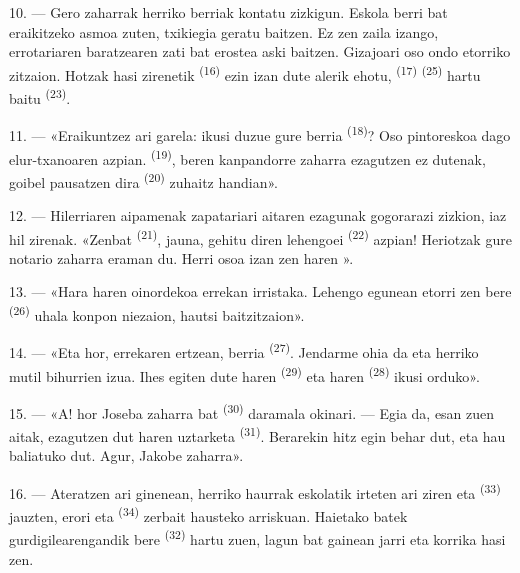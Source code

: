 \VUsaut{3.0mm}
\VUsaut{3.0mm}

10. --- Gero zaharrak herriko berriak kontatu zizkigun. Eskola berri bat eraikitzeko
asmoa zuten,  txikiegia geratu baitzen. Ez zen zaila izango,
errotariaren baratzearen zati bat erostea aski baitzen. Gizajoari oso ondo etorriko
zitzaion. Hotzak hasi zirenetik  \textsuperscript{(16)}
 ezin izan dute alerik ehotu, 
\textsuperscript{(17)}  \textsuperscript{(25)} hartu baitu
 \textsuperscript{(23)}.

11. --- «Eraikuntzez ari garela: ikusi duzue gure  berria
\textsuperscript{(18)}? Oso pintoreskoa dago elur-txanoaren azpian.
 \textsuperscript{(19)}, beren kanpandorre zaharra ezagutzen ez
dutenak, goibel pausatzen dira  \textsuperscript{(20)} zuhaitz
handian».

12. --- Hilerriaren aipamenak zapatariari aitaren ezagunak gogorarazi zizkion,
iaz hil zirenak. «Zenbat  \textsuperscript{(21)}, jauna, gehitu
diren lehengoei  \textsuperscript{(22)} azpian! Heriotzak
gure notario zaharra eraman du. Herri osoa izan zen haren ».

13. --- «Hara haren oinordekoa errekan irristaka. Lehengo egunean etorri zen bere
 \textsuperscript{(26)} uhala konpon niezaion, hautsi
baitzitzaion».

14. --- «Eta hor, errekaren ertzean,  berria
\textsuperscript{(27)}. Jendarme ohia da eta herriko mutil bihurrien izua. Ihes
egiten dute haren  \textsuperscript{(29)} eta haren
 \textsuperscript{(28)} ikusi orduko».

15. --- «A! hor Joseba zaharra  bat \textsuperscript{(30)}
daramala okinari. --- Egia da, esan zuen aitak, ezagutzen dut haren 
uztarketa \textsuperscript{(31)}. Berarekin hitz egin behar dut, eta hau
baliatuko dut. Agur, Jakobe zaharra».

16. --- Ateratzen ari ginenean, herriko haurrak eskolatik irteten ari ziren eta
 \textsuperscript{(33)} jauzten, erori eta
 \textsuperscript{(34)} zerbait hausteko arriskuan. Haietako
batek gurdigilearengandik bere  \textsuperscript{(32)} hartu zuen,
lagun bat gainean jarri eta korrika hasi zen.

